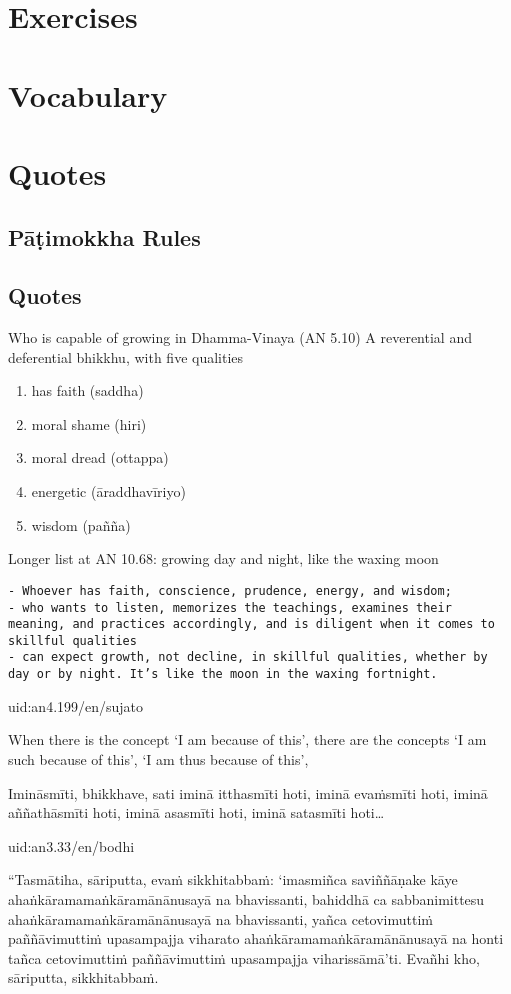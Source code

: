 \documentclass[11pt,oneside]{memoir}
\begin{document}
\section{Exercises}
\label{sec:org9d6a4d3}
\section{Vocabulary}
\label{sec:org78b17da}
\section{Quotes}
\label{sec:org62574e8}
\subsection{Pāṭimokkha Rules}
\label{sec:org03c8608}
\subsection{Quotes}
\label{sec:org2240cf5}

Who is capable of growing in Dhamma-Vinaya (AN 5.10)
A reverential and deferential bhikkhu, with five qualities
\begin{enumerate}
\item has faith (saddha)
\item moral shame (hiri)
\item moral dread (ottappa)
\item energetic (āraddhavīriyo)
\item wisdom (pañña)
\end{enumerate}

Longer list at AN 10.68: growing day and night, like the waxing moon

\begin{verbatim}
- Whoever has faith, conscience, prudence, energy, and wisdom;
- who wants to listen, memorizes the teachings, examines their meaning, and practices accordingly, and is diligent when it comes to skillful qualities
- can expect growth, not decline, in skillful qualities, whether by day or by night. It’s like the moon in the waxing fortnight.
\end{verbatim}

uid:an4.199/en/sujato

When there is the concept ‘I am because of this’, there are the concepts ‘I am such because of this’, ‘I am thus because of this’,

Imināsmīti, bhikkhave, sati iminā itthasmīti hoti, iminā evaṁsmīti hoti, iminā aññathāsmīti hoti, iminā asasmīti hoti, iminā satasmīti hoti\ldots{}

uid:an3.33/en/bodhi

“Tasmātiha, sāriputta, evaṁ sikkhitabbaṁ: ‘imasmiñca saviññāṇake kāye ahaṅkāramamaṅkāramānānusayā na bhavissanti, bahiddhā ca sabbanimittesu ahaṅkāramamaṅkāramānānusayā na bhavissanti, yañca cetovimuttiṁ paññāvimuttiṁ upasampajja viharato ahaṅkāramamaṅkāramānānusayā na honti tañca cetovimuttiṁ paññāvimuttiṁ upasampajja viharissāmā’ti. Evañhi kho, sāriputta, sikkhitabbaṁ.
\end{document}
